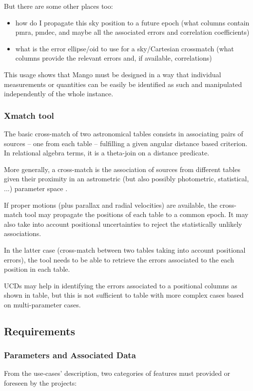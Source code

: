 \documentclass[11pt,a4paper]{ivoa}
\begin{document}
But there are some other places too:
\begin{itemize}
    \item how do I propagate this sky position to a future epoch
    (what columns contain pmra, pmdec, and maybe all the
     associated errors and correlation coefficients)

    \item what is the error ellipse/oid to use for a sky/Cartesian crossmatch
    (what columns provide the relevant errors and, if available,
     correlations)
\end{itemize}

This usage shows that Mango must be designed in a way that individual measurements or quantities
can be easily be identified as such and manipulated independently of the whole instance.

\subsubsection{Xmatch tool }
The basic cross-match of two astronomical tables consists in associating pairs of sources -- one 
from each table -- fulfilling a given angular distance based criterion.
In relational algebra terms, it is a theta-join on a distance predicate.

More generally, a cross-match is the association of sources from different tables given their 
proximity in an astrometric (but also possibly photometric, statistical, ...) parameter
space \citep{2017A&A...597A..89P} .

If proper motions (plus parallax and radial velocities) are available, the cross-match tool 
may propagate the positions of each table to a common epoch.
It may also take into account positional uncertainties to reject the statistically unlikely associations.

In the latter case (cross-match between two tables taking into account positional errors),
the tool needs to be able to retrieve the errors associated to the each position in each table.

UCDs may help in identifying the errors associated to a positional columns as shown in 
table, but this is not sufficient to table with more complex cases based on multi-parameter cases.

\subsection{Requirements}

\subsubsection{Parameters and Associated Data}
From the use-cases' description, two categories of features must provided or foreseen by the projects:
\end{document}
